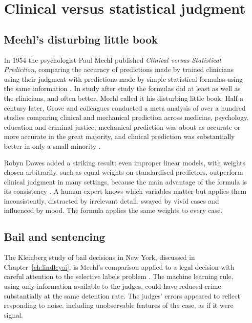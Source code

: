 \section{Clinical versus statistical judgment}

\subsection{Meehl's disturbing little book}

In 1954 the psychologist Paul Meehl published \emph{Clinical versus Statistical Prediction}, comparing the accuracy of predictions made by trained clinicians using their judgment with predictions made by simple statistical formulas using the same information \citep{meehl1954}. In study after study the formulas did at least as well as the clinicians, and often better. Meehl called it his disturbing little book. Half a century later, Grove and colleagues conducted a meta analysis of over a hundred studies comparing clinical and mechanical prediction across medicine, psychology, education and criminal justice; mechanical prediction was about as accurate or more accurate in the great majority, and clinical prediction was substantially better in only a small minority \citep{grove2000}.

Robyn Dawes added a striking result: even improper linear models, with weights chosen arbitrarily, such as equal weights on standardised predictors, outperform clinical judgment in many settings, because the main advantage of the formula is its consistency \citep{dawes1979}. A human expert knows which variables matter but applies them inconsistently, distracted by irrelevant detail, swayed by vivid cases and influenced by mood. The formula applies the same weights to every case.

\subsection{Bail and sentencing}

The Kleinberg study of bail decisions in New York, discussed in Chapter~\ref{ch:lindleyai}, is Meehl's comparison applied to a legal decision with careful attention to the selective labels problem \citep{kleinberg2018}. The machine learning rule, using only information available to the judges, could have reduced crime substantially at the same detention rate. The judges' errors appeared to reflect responding to noise, including unobservable features of the case, as if it were signal.

